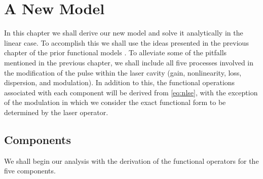 
\chapter{A New Model}
\label{chap:linear}
In this chapter we shall derive our new model and solve it analytically in the linear case. To accomplish this we shall use the ideas presented in the previous chapter of the prior functional models \cite{cutler, siegman, kuizenga1970a, kuizenga1970b, kuizenga1970, martinez1984, martinez1985, burgoyne2014}. To alleviate some of the pitfalls mentioned in the previous chapter, we shall include all five processes involved in the modification of the pulse within the laser cavity (gain, nonlinearity, loss, dispersion, and modulation). In addition to this, the functional operations associated with each component will be derived from \eqref{eq:nlse}, with the exception of the modulation in which we consider the exact functional form to be determined by the laser operator.

\section{Components}
\label{sec:comp}
We shall begin our analysis with the derivation of the functional operators for the five components.

